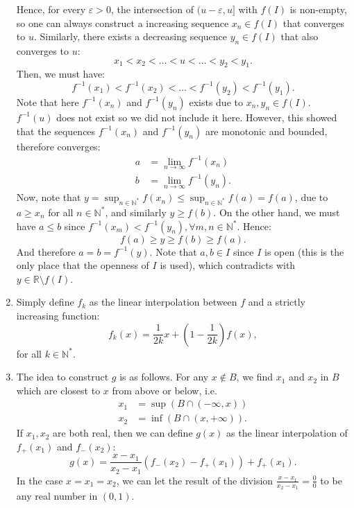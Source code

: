 \begin{enumerate}[label=\textbf{2B.\arabic*}]
  Hence, for every \( \varepsilon > 0 \), the intersection of \( (u -
  \varepsilon, u] \) with \( f(I) \) is non-empty, so one can always construct a
  increasing sequence \( x_{n} \in f(I) \) that converges to \( u \). Similarly,
  there exists a decreasing sequence \( y_{n} \in f(I) \) that also converges to
  \( u \):
  \[
    x_{1} < x_{2} < \ldots < u < \ldots < y_{2} < y_{1}
  .\] 
  Then, we must have:
  \[
    f^{-1}(x_{1}) < f^{-1}(x_{2}) < \ldots  < f^{-1}(y_{2}) < f^{-1}(y_{1})
  .\] 
  Note that here \( f^{-1}(x_{n}) \) and \( f^{-1}(y_{n}) \) exists due to \(
  x_{n}, y_{n} \in f(I) \). \( f^{-1}(u) \) does not exist so we did not
  include it here. However, this showed that the sequences \( f^{-1}(x_{n}) \)
  and \( f^{-1}(y_{n}) \) are monotonic and bounded, therefore converges:
  \begin{align*}
    a &= \lim_{n \to \infty} f^{-1}(x_{n})\\
    b &= \lim_{n \to \infty} f^{-1}(y_{n})
  .\end{align*}
  Now, note that \( y = \sup_{n \in \mathbb{N}^{*}} f(x_{n}) \le \sup_{n \in
  \mathbb{N}^{*}} f(a) = f(a) \), due to \( a \ge  x_{n} \) for all \(  n \in
  \mathbb{N}^{*} \), and similarly \( y \ge f(b) \). On the other hand, we must
  have \( a \le b \) since \( f^{-1}(x_{m}) < f^{-1}(y_{n}), \forall m, n \in
  \mathbb{N}^{*} \). Hence:
  \[
    f(a) \ge y \ge f(b) \ge f(a)
  .\] 
  And therefore \( a = b = f^{-1}(y) \). Note that \( a, b \in I \) since \( I
  \) is open (this is the only place that the openness of \( I \) is used),
  which contradicts with \( y \in \mathbb{R} \setminus f(I) \).

\item
  Simply define \( f_{k} \) as the linear interpolation between \( f \) and a
  strictly increasing function:
  \[
    f_{k}(x) = \frac{1}{2k}x + \left( 1 - \frac{1}{2k} \right) f(x)
  ,\] for all \(  k\in \mathbb{N}^{*} \).
\item The idea to construct \( g \) is as follows. For any \( x \notin B \), we
  find \( x_{1} \) and \( x_{2} \) in \( B \) which are closest to \( x \) from
  above or below, i.e.
  \begin{align*}
    x_{1} &= \sup \left( B \cap (-\infty, x) \right)  \\
    x_{2} &= \inf (B \cap (x, +\infty))
  .\end{align*}
  If \( x_{1}, x_{2} \) are both real, then we can define \( g(x) \) as the
  linear interpolation of \( f_{+}(x_{1}) \) and \( f_{-}(x_{2}) \):
  \[
    g(x) = \frac{x - x_{1}}{x_{2} - x_{1}}(f_{-}(x_{2}) - f_{+}(x_{1})) + f_{+}(x_{1})
  .\] 
  In the case \( x = x_{1} = x_{2} \), we can let the result of the division \(
  \frac{x - x_{1}}{x_{2} - x_{1}} = \frac{0}{0}\) to be any real number in \(
  (0, 1) \).


\end{enumerate}
